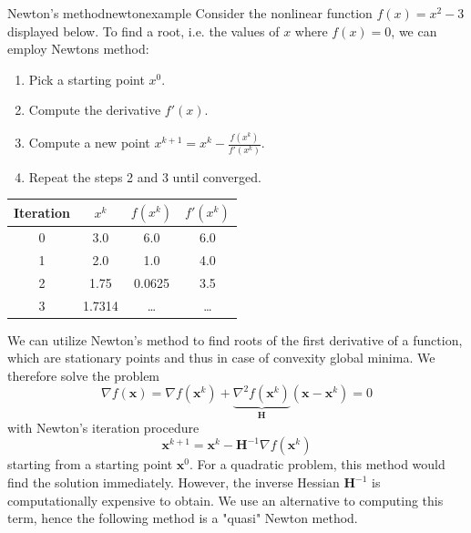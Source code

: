 \begin{example}{Newton's method}{newtonexample}
    Consider the nonlinear function $f(x) = x^2 - 3$ displayed below. To find a root, i.e. the values of $x$ where $f(x)=0$, we can employ Newtons method: 
    \begin{enumerate}
        \item Pick a starting point $x^0$.
        \item Compute the derivative $f'(x)$.
        \item Compute a new point $x^{k+1} = x^k - \frac{f(x^k)}{f'(x^k)}$.
        \item Repeat the steps 2 and 3 until converged.
    \end{enumerate}
    
    
    \begin{center}    
        \begin{tabular}{cccc}
    
             Iteration  & $x^k$     & $f(x^k)$  & $f'(x^k)$\\
             \hline
             0          & 3.0       & 6.0       & 6.0\\
             1          & 2.0       & 1.0       & 4.0\\
             2          & 1.75      & 0.0625    & 3.5\\
             3          & 1.7314    & \dots     & \dots\\
        \end{tabular}
    \end{center}
\end{example}


We can utilize Newton's method to find roots of the first derivative of a function, which are stationary points and thus in case of convexity global minima.
We therefore solve the problem 
\begin{equation}
    \nabla f(\mathbf{x}) = \nabla f(\mathbf{x}^k) + \underbrace{\nabla^2 f(\mathbf{x}^k)}_{\mathbf{H}} (\mathbf{x}-\mathbf{x}^k) = 0
\end{equation}
with Newton's iteration procedure 
\begin{equation}
    \mathbf{x}^{k+1} = \mathbf{x}^k  - \mathbf{H}^{-1} \nabla f(\mathbf{x}^k) 
\end{equation}
starting from a starting point $\mathbf{x}^0$. For a quadratic problem, this method would find the solution immediately. However, the inverse Hessian $\mathbf{H}^{-1}$ is computationally expensive to obtain. We use an alternative to computing this term, hence the following method is a "quasi" Newton method. 

